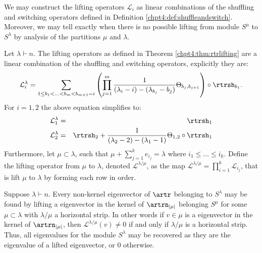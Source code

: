 \documentclass[11pt]{report}
\begin{document}
We may construct the lifting operators $\mathcal{L}_{i}$ as linear combinations of the shuffling and switching operators defined in Definition \ref{chpt4:def:shuffleandswitch}. Moreover, we may tell exactly when there is no possible lifting from module $S^{\mu}$ to $S^{\lambda}$ by analysis of the partitions $\mu$ and $\lambda$.

\begin{lemma}
	\label{chpt4:lem:liftingoperators}
	Let $\lambda \vdash n$. The lifting operators as defined in Theorem 
	\ref{chpt4:thm:rtrlifting} are a linear combination of the shuffling and switching operators, explicitly they are:	
	\begin{eqnarray}
	\mathcal{L}_{i}^{\lambda} = \sum_{1\leq b_{1} <\ldots <b_{m} <b_{m+1}=i} \left( \prod_{j=1}^{m} \frac{1}{(\lambda_{i} -i) - (\lambda_{b_{j}} -b_{j})}\Theta_{b_{j},b_{j+1}} \right) \circ \rtrsh_{b_{1}}.	
	\end{eqnarray}
	For $i=1,2$ the above equation simplifies to:
	\begin{eqnarray}
	\mathcal{L}^{\lambda}_{1} & = & \rtrsh_{1} \\
	\mathcal{L}^{\lambda}_{2} & = & \rtrsh_{2} + \frac{1}{(\lambda_{2}-2) - 
		(\lambda_{1}-1)}\Theta_{1,2} \circ \rtrsh_{1} 
	\end{eqnarray}
	Furthermore, let $\mu \subset \lambda$, such that $\mu + \sum_{j=1}^{k} e_{i_{j}} = \lambda$ where $i_{1} \leq \ldots \leq i_{k}$. Define the lifting operator from $\mu$ to $\lambda$, denoted $\mathcal{L}^{\lambda/\mu}$, as the map $\mathcal{L}^{\lambda/\mu} = \prod_{i=1}^{k} \mathcal{L}_{i_{j}}$, that is lift $\mu$ to $\lambda$ by forming each row in order.
\end{lemma}

\begin{thm}
	\label{chpt4:thm:detailedlifting}
	Suppose $\lambda \vdash n$. Every non-kernel eigenvector of $\artr$ belonging to $S^{\lambda}$ may be found by lifting a eigenvector in the kernel of $\artrn_{|\mu|}$ belonging $S^{\mu}$ for some $\mu \subset \lambda$ with $\lambda / \mu$ a horizontal strip. In other words if $v \in \mu$ is a eigenvector in the kernel of $\artrn_{|\mu|}$, then $\mathcal{L}^{\lambda /\mu} (v) \neq 0$ if and only if $\lambda/\mu$ is a horizontal strip. Thus, all eigenvalues for the module $S^{\lambda}$ may be recovered as they are the eigenvalue of a lifted eigenvector, or $0$ otherwise.
\end{thm}
\end{document}
